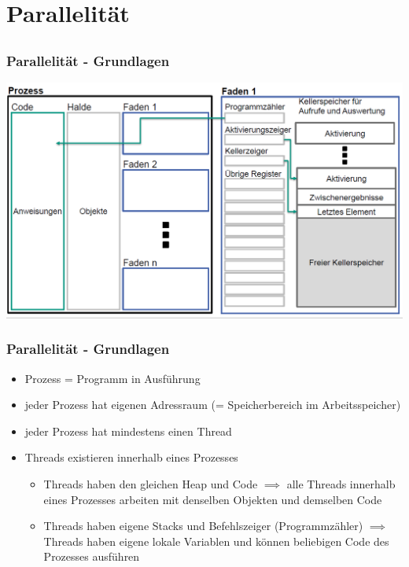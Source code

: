 \documentclass[18pt]{beamer}
\begin{document}
	
\section{Parallelität}
	\subsection{}	
	
	\begin{frame}
		\frametitle{Parallelität - Grundlagen}
		\includegraphics[scale=0.34]{./pics/tut5/proc-thr.png}
	\end{frame}

	\begin{frame}
		\frametitle{Parallelität - Grundlagen}
		\begin{itemize}
			\item Prozess = Programm in Ausführung \pause
			\item jeder Prozess hat eigenen Adressraum (= Speicherbereich im Arbeitsspeicher) \pause
			\item jeder Prozess hat mindestens einen Thread \pause
			\item Threads existieren innerhalb eines Prozesses \pause 
			\begin{itemize}
				\item Threads haben den gleichen Heap und Code \pause 
					\linebreak $\implies$ alle Threads innerhalb eines Prozesses arbeiten mit denselben Objekten und demselben Code \pause 
				\item Threads haben eigene Stacks und Befehlszeiger (Programmzähler) \pause 
					\linebreak $\implies$ Threads haben eigene lokale Variablen und können beliebigen Code des Prozesses ausführen
			\end{itemize}
		\end{itemize}
	\end{frame}
	
\end{document}
